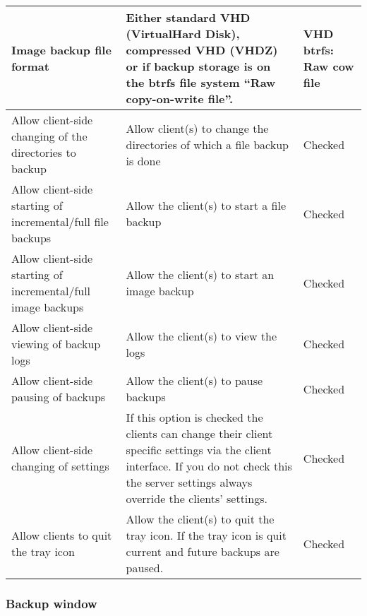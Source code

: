 \documentclass[a4paper,10pt]{article}
\begin{document}
\begin{longtable}{|p{}|p{}|p{}|}
\hline
Image backup file format & Either standard VHD (VirtualHard Disk), compressed VHD (VHDZ) or if backup storage is on the btrfs file system ``Raw copy-on-write file''. & VHD btrfs: Raw cow file\\
\hline
Allow client-side changing of the directories to backup & Allow client(s) to change the directories of which a file backup is done & Checked \\
\hline
Allow client-side starting of incremental/full file backups & Allow the client(s) to start a file backup & Checked \\
\hline
Allow client-side starting of incremental/full image backups & Allow the client(s) to start an image backup & Checked \\
\hline
Allow client-side viewing of backup logs & Allow the client(s) to view the logs & Checked \\
\hline
Allow client-side pausing of backups & Allow the client(s) to pause backups & Checked \\
\hline
Allow client-side changing of settings & If this option is checked the clients can change their client specific settings via the client interface. If you do not check this the server settings always override the clients' settings. & Checked\\
\hline
Allow clients to quit the tray icon & Allow the client(s) to quit the tray icon. If the tray icon is quit current and future backups are paused. & Checked \\
\hline
\end{longtable}

\subsubsection{Backup window}
\label{subsub_backup_window}
\end{document}
